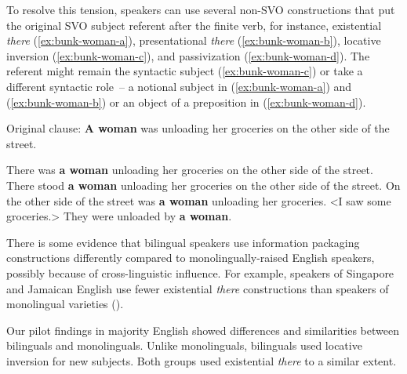 \documentclass[output=paper,colorlinks,citecolor=brown]{langscibook}
\begin{document}
To resolve this tension, speakers can use several non-SVO constructions that put the original SVO subject referent after the finite verb, for instance, existential \textit{there} (\ref{ex:bunk-woman-a}), presentational \textit{there} (\ref{ex:bunk-woman-b}), locative inversion (\ref{ex:bunk-woman-c}), and passivization (\ref{ex:bunk-woman-d}). The referent might remain the syntactic subject (\ref{ex:bunk-woman-c}) or take a different syntactic role~-- a notional subject in (\ref{ex:bunk-woman-a}) and (\ref{ex:bunk-woman-b}) or an object of a preposition in (\ref{ex:bunk-woman-d}). 

\begin{exe}
\ex \label{ex:bunk-woman} Original clause: {\textbf{A woman} was unloading her groceries on the other side of the street.}
\begin{xlist}
        \ex \label{ex:bunk-woman-a} {There was \textbf{a woman} unloading her groceries on the other side of the street.}
        \ex \label{ex:bunk-woman-b} {There stood \textbf{a woman} unloading her groceries on the other side of the street.}
        \ex \label{ex:bunk-woman-c} {On the other side of the street was \textbf{a woman} unloading her groceries.}
        \ex \label{ex:bunk-woman-d} <I saw some groceries.> {They were unloaded by \textbf{a woman}.}
    \end{xlist}
\end{exe}

There is some evidence that bilingual speakers use information packaging constructions differently compared to monolingually-raised English speakers, possibly because of cross-linguistic influence. For example, speakers of Singapore and Jamaican English use fewer existential \textit{there} constructions than speakers of monolingual varieties (\cite{winkle_non-canonical_2015}).  

Our pilot findings in majority English showed differences and similarities between bilinguals  and monolinguals. Unlike monolinguals, bilinguals used locative inversion for new subjects. Both groups used existential \textit{there} to a similar extent. 
\end{document}
